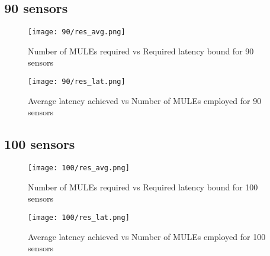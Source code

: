 \subsection{90 sensors}
\begin{figure}[H]
\texttt{[image: 90/res\_avg.png]}
\caption{Number of MULEs required vs Required latency bound for 90 sensors}
\end{figure}
\begin{figure}[H]
\texttt{[image: 90/res\_lat.png]}
\caption{Average latency achieved vs Number of MULEs employed for 90 sensors}
\end{figure}

\subsection{100 sensors}
\begin{figure}[H]
\texttt{[image: 100/res\_avg.png]}
\caption{Number of MULEs required vs Required latency bound for 100 sensors}
\end{figure}
\begin{figure}[H]
\texttt{[image: 100/res\_lat.png]}
\caption{Average latency achieved vs Number of MULEs employed for 100 sensors}
\end{figure}
